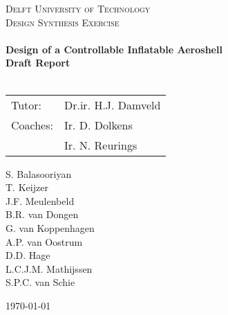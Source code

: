 \begin{titlepage}
\begin{center}
\AddToShipoutPicture*{\BackgroundPic}
\color{white}
\textsc{\LARGE Delft University of Technology}\\[0.3cm]
\textsc{\Large Design Synthesis Exercise}\\[0.5cm]

\vspace{4cm}
\HRule \\[0.4cm]
{\Large \bfseries Design of a Controllable Inflatable Aeroshell}\\[0.2cm]
{\Huge \bfseries Draft Report}\\[0.2cm]
\HRule \\[0.5cm]



\vspace{10cm}

\begin{tabular}{l l}
Tutor: & Dr.ir. H.J. Damveld \\
Coaches: & Ir. D. Dolkens \\ 
 & Ir. N. Reurings \\
\end{tabular}

\vspace{1cm}
\begin{multicols}{3}
	S. Balasooriyan \\ T. Keijzer \\ J.F. Meulenbeld \\ B.R. van Dongen \\  G. van Koppenhagen \\ A.P. van Oostrum \\ D.D. Hage  \\ L.C.J.M. Mathijssen   \\ S.P.C. van Schie 
	\enlargethispage{15mm} \vspace{20mm}
\end{multicols}

\vfill

\begin{large}\today \end{large}

\end{center}
\end{titlepage}